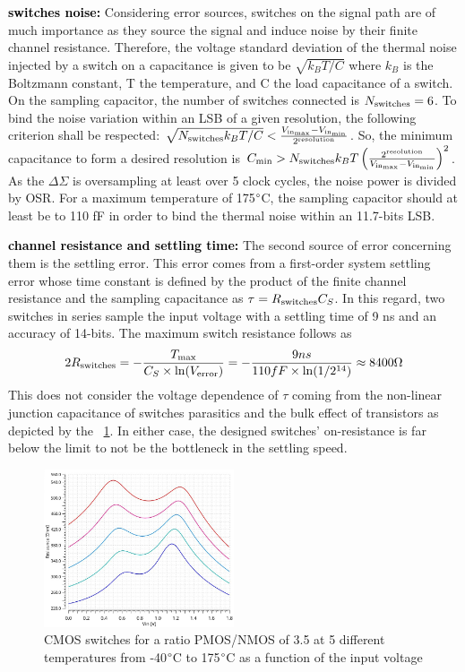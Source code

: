 \textbf{\textcolor{black}{switches noise:}}
Considering error sources, switches on the signal path are of much importance as they source the signal and induce noise by their finite channel resistance. 
Therefore, the voltage standard deviation of the thermal noise injected by a switch on a capacitance is given to be \(\sqrt{k_BT/C} \) where \(k_B\) is the Boltzmann constant, T the temperature, and C the load capacitance of a switch. On the sampling capacitor, the number of switches connected is $N_{\rm switches} = 6$. To bind the noise variation within an LSB of a given resolution, the following criterion shall be respected: $\sqrt{N_{\rm switches} k_BT/C} < \frac{V_{\rm in_{\max}}-V_{\rm in_{\min}}}{2^{\rm resolution}}$. So, the minimum capacitance to form a desired resolution is $C_{\min} > N_{\rm switches} k_BT \left(\frac{2^{\rm resolution}}{V_{\rm in_{\max}}-V_{\rm in_{\min}}} \right)^2$. As the $\Delta\Sigma$ is oversampling at least over 5 clock cycles, the noise power is divided by OSR\@. For a maximum temperature of 175\(\degree \)C, the sampling capacitor should at least be to 110 fF in order to bind the thermal noise within an 11.7-bits LSB\@.

\textbf{\textcolor{black}{channel resistance and settling time:}}
The second source of error concerning them is the settling error. This error comes from a first-order system settling error whose time constant is defined by the product of the finite channel resistance and the sampling capacitance as \(\tau = R_{\rm switches}C_S \). In this regard, two switches in series sample the input voltage with a settling time of 9 ns and an accuracy of 14-bits. The maximum switch resistance follows as 
\begin{equation}
2 R_{\rm switches} = -\frac{T_{\max}}{C_S \times \ln(V_{\rm error})} = - \frac{9 ns}{110 fF \times \ln (1/2^{14})} \approx 8400 \Omega
\end{equation}
This does not consider the voltage dependence of \(\tau \) coming from the non-linear junction capacitance of switches parasitics and the bulk effect of transistors as depicted by the \figurename~\ref{fig:cmos-ron-vin-temp}. In either case, the designed switches' on-resistance is far below the limit to not be the bottleneck in the settling speed.
\begin{figure}[htp]
	\centering
	\includegraphics[width=0.5\textwidth]{Chapter4/Figs/xt018_2u_180nm_3-5_resistance.jpg}
	\caption{CMOS switches for a ratio PMOS/NMOS of 3.5 at 5 different temperatures from -40$\degree$C to 175$\degree$C as a function of the input voltage}
	\label{fig:cmos-ron-vin-temp}
\end{figure}

